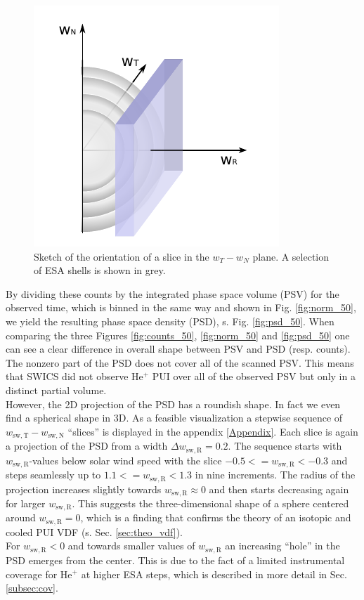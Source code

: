 \begin{figure}[h]
	\includegraphics[width=.5\textwidth]{Figures/sketch_slice_R2.pdf}
	\centering
	\caption{Sketch of the orientation of a slice in the $w_T - w_N$ plane. A selection of ESA shells is shown in grey.}
	\label{fig:sketch_slice_R}
\end{figure}
By dividing these counts by the integrated phase space volume (PSV) for the observed time, which is binned in the same way and shown in Fig. \ref{fig:norm_50}, we yield the resulting phase space density (PSD), s. Fig. \ref{fig:psd_50}. When comparing the three Figures \ref{fig:counts_50}, \ref{fig:norm_50} and \ref{fig:psd_50} one can see a clear difference in overall shape between PSV and PSD (resp. counts). The nonzero part of the PSD does not cover all of the scanned PSV. This means that SWICS did not observe $\mathrm{He^{+}}$ PUI over all of the observed PSV but only in a distinct partial volume.\\ 
However, the 2D projection of the PSD has a roundish shape. In fact we even find a spherical shape in 3D. As a feasible visualization a stepwise sequence of $w_\mathrm{sw,T} - w_\mathrm{sw,N}$ ``slices'' is displayed in the appendix \ref{Appendix}. Each slice is again a projection of the PSD from a width $\Delta w_\mathrm{sw,R} = 0.2$. The sequence starts with $w_\mathrm{sw,R}$-values below solar wind speed with the slice $-0.5 <= w_\mathrm{sw,R} < -0.3$ and steps seamlessly up to $1.1 <= w_\mathrm{sw,R} < 1.3$ in nine increments. The radius of the projection increases slightly towards $ w_\mathrm{sw,R} \approx 0$ and then starts decreasing again for larger $w_\mathrm{sw,R}$. This suggests the three-dimensional shape of a sphere centered around $w_\mathrm{sw,R} = 0$, which is a finding that confirms the theory of an isotopic and cooled PUI VDF (s. Sec. \ref{sec:theo_vdf}). \\
For $w_\mathrm{sw,R} < 0$ and towards smaller values of $w_\mathrm{sw,R}$ an increasing ``hole'' in the PSD emerges from the center. This is due to the fact of a limited instrumental coverage for $\mathrm{He^{+}}$ at higher ESA steps, which is described in more detail in Sec. \ref{subsec:cov}. \\
